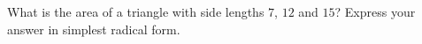 What is the area of a triangle with side lengths $7$, $12$ and $15$? Express your answer in simplest radical form.
